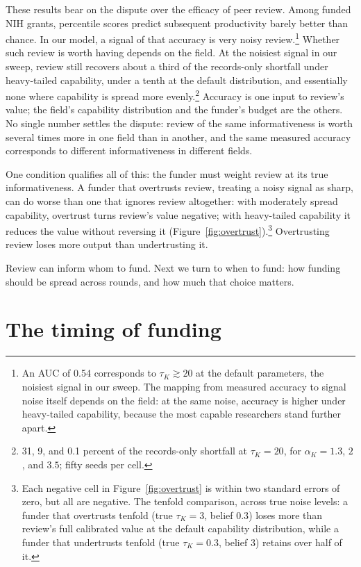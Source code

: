 \documentclass[article, 11pt, reqno]{amsart}
\theoremstyle{named}
\begin{document}
These results bear on the dispute over the efficacy of peer review. Among funded NIH
grants, percentile scores predict subsequent productivity barely better than chance. In
our model, a signal of that accuracy is very noisy review.\footnote{An AUC of 0.54
\citep{Fang2016} corresponds to $\tau_K \gtrsim 20$ at the default parameters, the
noisiest signal in our sweep. The mapping from measured accuracy to signal noise itself
depends on the field: at the same noise, accuracy is higher under heavy-tailed
capability, because the most capable researchers stand further apart.} Whether such
review is worth having depends on the field. At the noisiest signal in our sweep,
review still recovers about a third of the records-only shortfall under heavy-tailed
capability, under a tenth at the default distribution, and essentially none where
capability is spread more evenly.\footnote{31, 9, and 0.1 percent of the records-only
shortfall at $\tau_K = 20$, for $\alpha_K = 1.3$, $2$, and $3.5$; fifty seeds per
cell.} Accuracy is one input to review's value; the field's capability distribution and
the funder's budget are the others. No single number settles the dispute: review of the
same informativeness is worth several times more in one field than in another, and the
same measured accuracy corresponds to different informativeness in different fields.

One condition qualifies all of this: the funder must weight review at its true
informativeness. A funder that overtrusts review, treating a noisy signal as sharp, can
do worse than one that ignores review altogether: with moderately spread capability,
overtrust turns review's value negative; with heavy-tailed capability it reduces the
value without reversing it (Figure~\ref{fig:overtrust}).\footnote{Each negative cell
in Figure~\ref{fig:overtrust} is within two standard errors of zero, but all are
negative. The tenfold comparison, across true noise levels: a funder that overtrusts
tenfold (true $\tau_K = 3$, belief $0.3$) loses more than review's full calibrated
value at the default capability distribution, while a funder that undertrusts tenfold
(true $\tau_K = 0.3$, belief $3$) retains over half of it.} Overtrusting review loses more output than
undertrusting it.



Review can inform whom to fund. Next we turn to when to fund: how funding should be
spread across rounds, and how much that choice matters.

\section{The timing of funding}\label{sec:timing}
\end{document}
